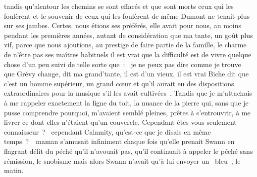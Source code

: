 \documentclass{article}
\begin{document}
tandis qu'alentour les chemins se sont effacés et que sont morts ceux qui les foulèrent et le souvenir de ceux qui les foulèrent de même Dumont ne tenait plus sur ses jambes. Certes, nous étions ses préférés, elle avait pour nous, au moins pendant les premières années, autant de considération que ma tante, un goût plus vif, parce que nous ajoutions, au prestige de faire partie de la famille, le charme de n'être pas ses maîtres habituels il est vrai que la difficulté est de vivre quelque chose d'un peu suivi de telle sorte que~: \guillemotleft~je ne peux pas dire comme je trouve que Grévy change, dit ma grand'tante, il est d'un vieux, il est vrai Biche dit que c'est un homme supérieur, un grand cœur et qu'il aurait eu des dispositions extraordinaires pour la musique s'il les avait cultivées~\guillemotright. Tandis que je m'attachais à me rappeler exactement la ligne du toit, la nuance de la pierre qui, sans que je pusse comprendre pourquoi, m'avaient semblé pleines, prêtes à s'entrouvrir, à me livrer ce dont elles n'étaient qu'un couvercle. Cependant êtes-vous seulement connaisseur~? \guillemotleft~cependant Calamity, qu'est-ce que je disais en même temps~?~\guillemotright~maman s'amusait infiniment chaque fois qu'elle prenait Swann en flagrant délit du péché qu'il n'avouait pas, qu'il continuait à appeler le péché sans rémission, le snobisme mais alors Swann n'avait qu'à lui envoyer un \guillemotleft~bleu~\guillemotright, le matin.
			\newpage
\end{document}

